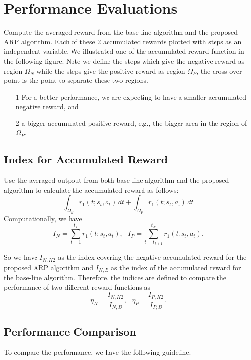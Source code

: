 \documentclass[conference]{IEEEtran}
\begin{document}
\section{Performance Evaluations}
Compute the averaged reward from the base-line algorithm and 
the proposed ARP algorithm. Each of these 2 accumulated rewards
plotted with steps as an independent variable. We illustrated 
one of the accumulated reward function in the following figure. 
Note we define the steps which give the negative reward as 
region $\Omega_N$ while the steps give the positive reward
as region $\Omega_P$, the cross-over point is the point to 
separate these two regions.   
\begin{itemize}
\item[1] For a better performance, we are expecting to have 
a smaller accumulated negative reward, and  
\item[2] a bigger accumulated positive reward, e.g., the 
bigger area in the region of $\Omega_P$. 
\end{itemize}
\subsection{Index for Accumulated Reward}
Use the averaged outpout from both base-line algorithm and 
the proposed algorithm to calculate the accumulated 
reward as follows: 
\begin{equation}
\int_{\Omega_{N}} r_1(t;s_t, a_t) \,dt 
+
\int_{\Omega_{P}} r_1(t;s_t, a_t) \,dt  
\label{eq:int-accumulated-reward} 
\end{equation}
Computationally, we have 
\begin{equation} 
I_N  
=
\sum_{t=1}^{t_k} r_1(t;s_t, a_t) , \text{      } I_P 
=
\sum_{t=t_{k+1}}^{t_N} r_1(t;s_t, a_t).  
\label{eq:indexP-discrete-accumulated-reward} 
\end{equation}

So we have $I_{N,K2}$ as the index 
covering the negative accumulated reward for the 
proposed ARP algorithm and $I_{N,B}$ as the index
of the accumulated reward for the base-line algorithm. 
Therefore, the indices are defined to compare the 
performance of two different reward functions as 
\begin{equation} 
\eta_N 
= \frac{I_{N,K2}}{I_{N,B}} , \text{      } \eta_P
= \frac{I_{P,K2}}{I_{P,B}} . 
\label{eq:EtaN-discrete-accumulated-reward} 
\end{equation}

\subsection{Performance Comparison}  
To compare the performance,
we have the following guideline.
\end{document}
